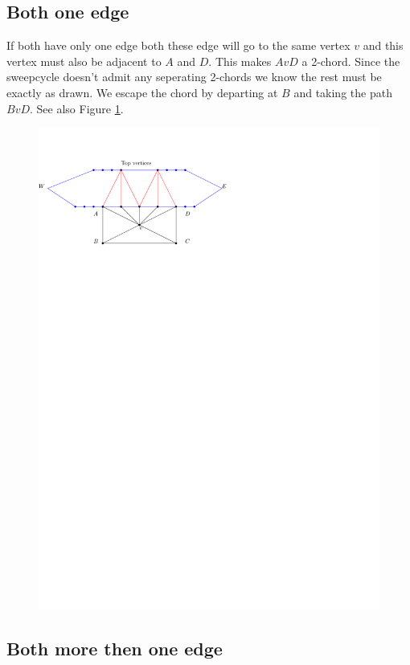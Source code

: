 \subsection{Both one edge}

If both have only one edge both these edge will go to the same vertex $v$ and this vertex must also be adjacent to $A$ and $D$. This makes $AvD$ a 2-chord. Since the sweepcycle doesn't admit any seperating 2-chords we know the rest must be exactly as drawn. We escape the chord by departing at $B$ and taking the path $BvD$.
See also Figure \ref{fig:chord:oneonefan}.

\begin{figure}[h]
  \centering
  \includegraphics[scale=1]{chordShrink/img/oneonefan}
  \caption{}
  \label{fig:chord:oneonefan}
\end{figure}


\subsection{Both more then one edge}

